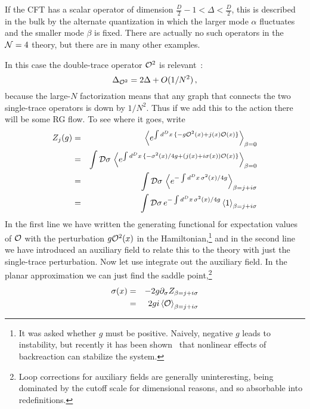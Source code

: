 \documentclass[12pt]{article}
\begin{document}
{If the CFT has a scalar operator of dimension $\frac{D}{2} - 1 < \Delta < \frac{D}{2}$, this is described in the bulk by the alternate quantization in which the larger mode $\alpha$ fluctuates and the smaller mode $\beta$ is fixed.  There are actually no such operators in the ${\cal N}=4$ theory, but there are in many other examples.

In this case the double-trace operator ${\cal O}^2$ is relevant~\cite{Witten:2001ua,Berkooz:2002ug}: 
\begin{equation}
\Delta_{{\cal O}^2} = 2\Delta + O(1/N^2) \,,
\end{equation}
because the large-$N$ factorization means that any graph that connects the two single-trace operators is down by $1/N^2$.  Thus if we add this to the action there will be some RG flow.
To see where it goes, write~\cite{Berkooz:2002ug}
\begin{eqnarray}
Z_j(g) &=& \left\langle e^{\int d^Dx\,\{ -g {\cal O}^2(x)+ j(x) {\cal O}(x) \}} \right\rangle_{\beta=0} \nonumber\\
&=& \int {\cal D}\sigma \, \left\langle e^{\int d^Dx\,\{ - \sigma^2(x)/4g + (j(x) + i\sigma(x)) {\cal O}(x) \}}
\right\rangle_{\beta=0} \nonumber\\
&=& \int {\cal D}\sigma \, \left\langle e^{- \int d^Dx\, \sigma^2(x)/4g }
\right\rangle_{\beta= j + i\sigma}\nonumber\\
&=& \int {\cal D}\sigma \,  e^{- \int d^Dx\, \sigma^2(x)/4g }
 \left\langle1\right\rangle_{\beta= j +i \sigma}
 \label{aux}
\end{eqnarray}
In the first line we have written the generating functional for expectation values of $\cal O$ with the perturbation $g{\cal O}^2(x)$ in the Hamiltonian,\footnote{It was asked whether $g$ must be positive.  Naively, negative $g$ leads to instability, but recently it has been shown~\cite{Faulkner:2010gj} that nonlinear effects of backreaction can stabilize the system.}
 and in the second line we have introduced an auxiliary field to relate this to the theory with just the single-trace perturbation.  Now let use integrate out the auxiliary field.  In the planar approximation we can just find the saddle point,\footnote{Loop corrections for auxiliary fields are generally uninteresting, being dominated by the cutoff scale for dimensional reasons, and so absorbable into redefinitions.}
\begin{eqnarray}
\sigma(x) &=& -2g \partial_\sigma Z_{\beta= j + i\sigma} \nonumber\\
&=& 2gi  \left\langle {\cal O}\right\rangle_{\beta= j + i\sigma} \nonumber\\

\end{eqnarray}}
\end{document}
